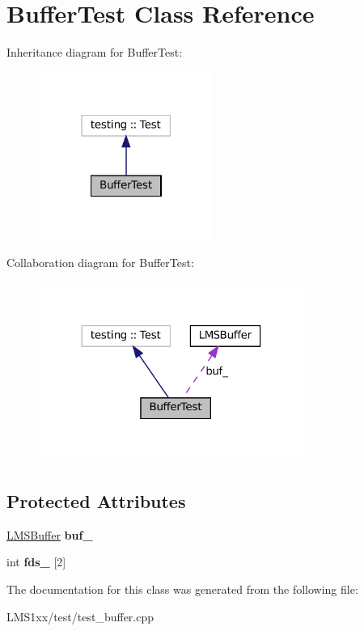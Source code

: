 \hypertarget{classBufferTest}{}\section{Buffer\+Test Class Reference}
\label{classBufferTest}


Inheritance diagram for Buffer\+Test\+:
\nopagebreak
\begin{figure}[H]
\begin{center}
\leavevmode
\includegraphics[width=162pt]{classBufferTest__inherit__graph}
\end{center}
\end{figure}


Collaboration diagram for Buffer\+Test\+:
\nopagebreak
\begin{figure}[H]
\begin{center}
\leavevmode
\includegraphics[width=246pt]{classBufferTest__coll__graph}
\end{center}
\end{figure}
\subsection*{Protected Attributes}
\begin{DoxyCompactItemize}
\item 
\mbox{\label{classBufferTest_aa21c05b9f9cd28f8639f92468994844f}} 
\hyperlink{classLMSBuffer}{L\+M\+S\+Buffer} {\bfseries buf\+\_\+}
\item 
\mbox{\label{classBufferTest_a0b4d705924f4c55bbe1e43524ce3ade7}} 
int {\bfseries fds\+\_\+} \mbox{[}2\mbox{]}
\end{DoxyCompactItemize}


The documentation for this class was generated from the following file\+:\begin{DoxyCompactItemize}
\item 
L\+M\+S1xx/test/test\+\_\+buffer.\+cpp\end{DoxyCompactItemize}
